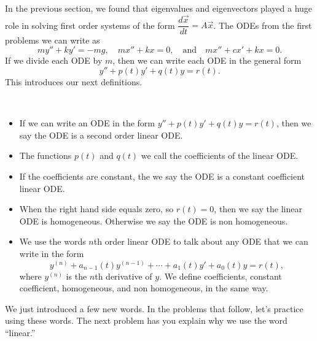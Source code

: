 \mysubsection{\ideaD}

In the previous section, we found that eigenvalues and eigenvectors played a huge role in solving first order systems of the form 
$\dfrac{d\vec{x}}{dt} =A\vec x$. 
The ODEs from the first problems we can write as
$$my''+ky'=-mg,
\quad mx''+kx=0,
\quad \text{and}\quad mx''+cx'+kx=0.$$
If we divide each ODE by $m$, then we can write each ODE in the general form 
$$y''+p(t) y'+q(t)y=r(t).$$
This introduces our next definitions.
\begin{definition}
\
\begin{itemize}
 \item If we can write an ODE in the form  $y''+p(t)y'+q(t)y=r(t)$, then we say the ODE is a second order linear ODE. 
 \item The functions $p(t)$ and $q(t)$ we call the coefficients of the linear ODE.
 \item If the coefficients are constant, the we say the ODE is a constant coefficient linear ODE.   
 \item When the right hand side equals zero, so $r(t)=0$, then we say the linear ODE is homogeneous. Otherwise we say the ODE is non homogeneous.
 \item We use the words $n$th order linear ODE to talk about any ODE that we can write in the form $$y^{(n)}+a_{n-1}(t)y^{(n-1)} + \cdots + a_1(t)y'+a_0(t)y=r(t),$$ where $y^{(n)}$ is the $n$th derivative of $y$. We define coefficients, constant coefficient, homogeneous, and non homogeneous, in the same way.
\end{itemize}
\end{definition}


We just introduced a few new words. In the problems that follow, let's practice using these words. The next problem has you explain why we use the word ``linear.''

